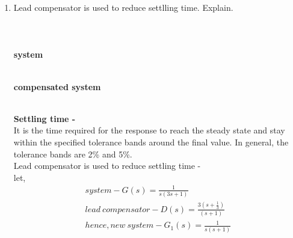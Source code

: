 \begin{enumerate}[label=\thesection.\arabic*.,ref=\thesection.\theenumi]
\item Lead compensator is used to reduce settlling time. Explain.\\
\\
\solution 
\\
\\
\textbf{system}
\begin{figure}[h]
\begin{center}
\resizebox{\columnwidth}{!}{}
\end{center}
\end{figure}\\

 \textbf{compensated system}
\begin{figure}[h]
\begin{center}
\resizebox{\columnwidth}{!}{}
\end{center}
\end{figure}\\
\textbf{Settling time - }\\
It is the time required for the response to reach the steady state and stay within the specified tolerance bands around the final value. In general, the tolerance bands are 2\% and 5\%.
\\
Lead compensator is used to reduce settling time - \\
let,\\
\begin{align}
system-G(s) = \frac{1}{s(3s+1)}\\
lead\ compensator-D(s) = \frac{3(s+\frac{1}{3})}{(s+1)} \\
hence, new\ system-G_{1}(s) = \frac{1}{s(s+1)}
\end{align}
\\


\end{enumerate}
